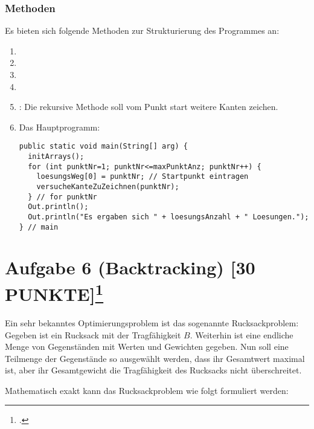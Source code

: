 \documentclass{lehramt-informatik}
\begin{document}
\subsubsection{Methoden}

Es bieten sich folgende Methoden zur Strukturierung des Programmes an:

\begin{enumerate}
\item {}
\item {}
\item {}
\item {}
\item {}: Die rekursive
Methode soll vom Punkt start weitere Kanten zeichen.

\item Das Hauptprogramm:

\begin{verbatim}
public static void main(String[] arg) {
  initArrays();
  for (int punktNr=1; punktNr<=maxPunktAnz; punktNr++) {
    loesungsWeg[0] = punktNr; // Startpunkt eintragen
    versucheKanteZuZeichnen(punktNr);
  } // for punktNr
  Out.println();
  Out.println("Es ergaben sich " + loesungsAnzahl + " Loesungen.");
} // main
\end{verbatim}

\end{enumerate}


%

\section{Aufgabe 6 (Backtracking) [30 PUNKTE]\footcite{examen:66115:2018:09}}

Ein sehr bekanntes Optimierungsproblem ist das sogenannte
Rucksackproblem: Gegeben ist ein Rucksack mit der Tragfähigkeit $B$.
Weiterhin ist eine endliche Menge von Gegenständen mit Werten und
Gewichten gegeben. Nun soll eine Teilmenge der Gegenstände so ausgewählt
werden, dass ihr Gesamtwert maximal ist, aber ihr Gesamtgewicht die
Tragfähigkeit des Rucksacks nicht überschreitet.

Mathematisch exakt kann das Rucksackproblem wie folgt formuliert werden:
\end{document}
